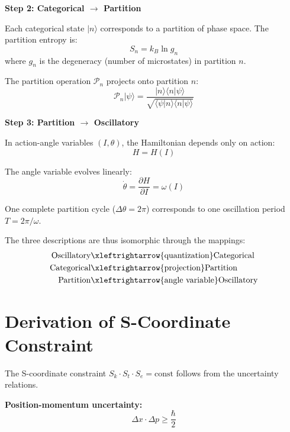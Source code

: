 \documentclass[aps,prl,twocolumn,superscriptaddress,floatfix]{revtex4-2}
\begin{document}
\textbf{Step 2: Categorical $\to$ Partition}

Each categorical state $|n\rangle$ corresponds to a partition of phase space. The partition entropy is:
\begin{equation}
S_n = k_B \ln g_n
\end{equation}
where $g_n$ is the degeneracy (number of microstates) in partition $n$.

The partition operation $\mathcal{P}_n$ projects onto partition $n$:
\begin{equation}
\mathcal{P}_n |\psi\rangle = \frac{|n\rangle\langle n|\psi\rangle}{\sqrt{\langle\psi|n\rangle\langle n|\psi\rangle}}
\end{equation}

\textbf{Step 3: Partition $\to$ Oscillatory}

In action-angle variables $(I, \theta)$, the Hamiltonian depends only on action:
\begin{equation}
H = H(I)
\end{equation}

The angle variable evolves linearly:
\begin{equation}
\dot{\theta} = \frac{\partial H}{\partial I} = \omega(I)
\end{equation}

One complete partition cycle ($\Delta\theta = 2\pi$) corresponds to one oscillation period $T = 2\pi/\omega$.

The three descriptions are thus isomorphic through the mappings:
\begin{align}
\text{Oscillatory} &\xleftrightarrow{\text{quantization}} \text{Categorical} \\
\text{Categorical} &\xleftrightarrow{\text{projection}} \text{Partition} \\
\text{Partition} &\xleftrightarrow{\text{angle variable}} \text{Oscillatory}
\end{align}

\section{Derivation of S-Coordinate Constraint}

The S-coordinate constraint $S_k \cdot S_t \cdot S_e = \text{const}$ follows from the uncertainty relations.

\textbf{Position-momentum uncertainty:}
\begin{equation}
\Delta x \cdot \Delta p \geq \frac{\hbar}{2}
\end{equation}
\end{document}
